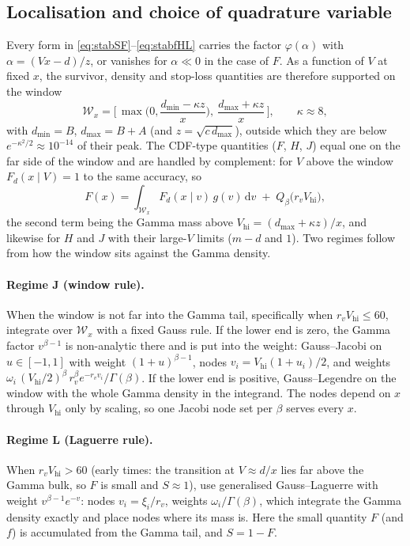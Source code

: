 \documentclass[11pt]{article}
\newcommand{\dd}{\,\mathrm{d}}
\begin{document}
\subsection{Localisation and choice of quadrature variable}
Every form in \eqref{eq:stabSF}--\eqref{eq:stabfHL} carries the factor $\varphi(\alpha)$ with $\alpha=(Vx-d)/z$, or vanishes for $\alpha\ll0$ in the case of $F$. As a function of $V$ at fixed $x$, the survivor, density and stop-loss quantities are therefore supported on the window
\begin{equation}
\mathcal W_x=\Big[\,\max\!\Big(0,\frac{d_{\min}-\kappa z}{x}\Big),\ \frac{d_{\max}+\kappa z}{x}\,\Big],\qquad \kappa\approx8,
\label{eq:window}
\end{equation}
with $d_{\min}=B$, $d_{\max}=B+A$ (and $z=\sqrt{c\,d_{\max}}$), outside which they are below $e^{-\kappa^2/2}\approx10^{-14}$ of their peak. The CDF-type quantities ($F$, $H$, $J$) equal one on the far side of the window and are handled by complement: for $V$ above the window $F_d(x\mid V)=1$ to the same accuracy, so
\begin{equation}
F(x)=\int_{\mathcal W_x}F_d(x\mid v)\,g(v)\dd v\;+\;Q_\beta\!\big(r_v V_{\mathrm{hi}}\big),
\label{eq:Fwindow}
\end{equation}
the second term being the Gamma mass above $V_{\mathrm{hi}}=(d_{\max}+\kappa z)/x$, and likewise for $H$ and $J$ with their large-$V$ limits ($m-d$ and $1$). Two regimes follow from how the window sits against the Gamma density.

\paragraph{Regime J (window rule).} When the window is not far into the Gamma tail, specifically when $r_vV_{\mathrm{hi}}\le 60$, integrate over $\mathcal W_x$ with a fixed Gauss rule. If the lower end is zero, the Gamma factor $v^{\beta-1}$ is non-analytic there and is put into the weight: Gauss--Jacobi on $u\in[-1,1]$ with weight $(1+u)^{\beta-1}$, nodes $v_i=V_{\mathrm{hi}}(1+u_i)/2$, and weights $\omega_i\,(V_{\mathrm{hi}}/2)^{\beta}\,r_v^{\beta}e^{-r_vv_i}/\Gamma(\beta)$. If the lower end is positive, Gauss--Legendre on the window with the whole Gamma density in the integrand. The nodes depend on $x$ through $V_{\mathrm{hi}}$ only by scaling, so one Jacobi node set per $\beta$ serves every $x$.

\paragraph{Regime L (Laguerre rule).} When $r_vV_{\mathrm{hi}}>60$ (early times: the transition at $V\approx d/x$ lies far above the Gamma bulk, so $F$ is small and $S\approx1$), use generalised Gauss--Laguerre with weight $v^{\beta-1}e^{-v}$: nodes $v_i=\xi_i/r_v$, weights $\omega_i/\Gamma(\beta)$, which integrate the Gamma density exactly and place nodes where its mass is. Here the small quantity $F$ (and $f$) is accumulated from the Gamma tail, and $S=1-F$.
\end{document}

